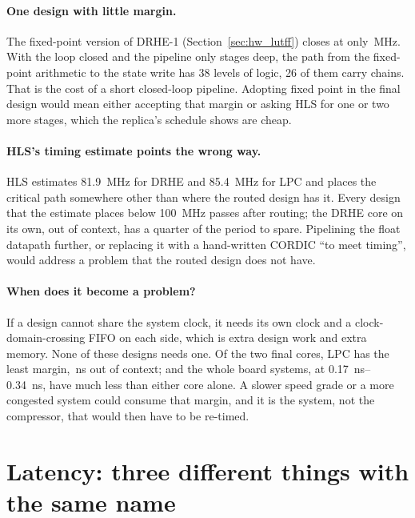 \paragraph{One design with little margin.} The fixed-point version of DRHE-1
(Section~\ref{sec:hw_lutff}) closes at only \,MHz. With the
loop closed and the pipeline only  stages deep, the path from
the fixed-point arithmetic to the state write has 38 levels of logic, 26 of
them carry chains. That is the cost of a short closed-loop pipeline. Adopting
fixed point in the final design would mean either accepting that margin or
asking HLS for one or two more stages, which the replica's schedule shows are
cheap.

\paragraph{HLS's timing estimate points the wrong way.} HLS estimates
\SI{81.9}{\mega\hertz} for DRHE and \SI{85.4}{\mega\hertz} for LPC and places
the critical path somewhere other than where the routed design has it. Every
design that the estimate places below \SI{100}{\mega\hertz} passes after
routing; the DRHE core on its own, out of context, has a quarter of the period
to spare. Pipelining the
float datapath further, or replacing it with a hand-written CORDIC ``to meet
timing'', would address a problem that the routed design does not have.

\paragraph{When does it become a problem?} If a design cannot share the system
clock, it needs its own clock and a clock-domain-crossing FIFO on each side,
which is extra design work and extra memory. None of these designs needs one.
Of the two final cores, LPC has the least margin, \,ns out of
context; and the whole board systems, at \SIrange{0.17}{0.34}{\nano\second},
have much less than either core alone. A slower speed grade or a more congested
system could consume that margin, and it is the system, not the compressor,
that would then have to be re-timed.

\section{Latency: three different things with the same name}
\label{sec:hw_latency}

